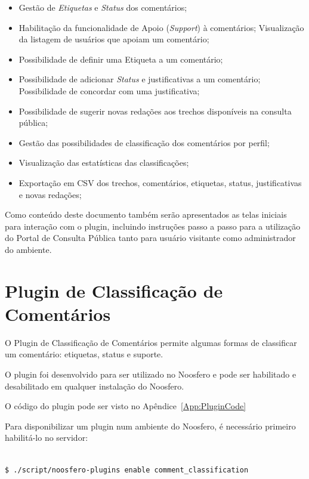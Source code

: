 \documentclass[11pt]{article}
\begin{document}
\begin{itemize}
  \item Gestão de {\it Etiquetas} e {\it Status} dos comentários;
  \item Habilitação da funcionalidade de Apoio ({\it Support}) à
comentários;
    \subitem Visualização da listagem de usuários que apoiam um comentário;
  \item Possibilidade de definir uma Etiqueta a um comentário;
  \item Possibilidade de adicionar {\it Status} e justificativas a um
comentário;
    \subitem Possibilidade de concordar com uma justificativa;
  \item Possibilidade de sugerir novas redações aos trechos disponíveis
na consulta pública;
  \item Gestão das possibilidades de classificação dos comentários por
perfil;
  \item Visualização das estatísticas das classificações;
  \item Exportação em CSV dos trechos, comentários, etiquetas, status,
justificativas e novas redações;
\end{itemize}

Como conteúdo deste documento também serão apresentados as telas
iniciais para interação com o plugin, incluindo instruções passo a
passo para a utilização do Portal de Consulta Pública tanto para usuário
visitante como administrador do ambiente.

\section{Plugin de Classificação de Comentários}

O Plugin de Classificação de Comentários permite algumas formas de
classificar um comentário: etiquetas, status e suporte.

O plugin foi desenvolvido para ser utilizado no Noosfero e pode ser
habilitado e desabilitado em qualquer instalação do Noosfero.

O código do plugin pode ser visto no Apêndice~\ref{App:PluginCode}

Para disponibilizar um plugin num ambiente do Noosfero, é necessário
primeiro habilitá-lo no servidor:

\begin{verbatim}

$ ./script/noosfero-plugins enable comment_classification

\end{verbatim}
\end{document}
